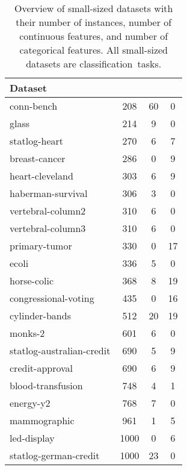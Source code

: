 \documentclass{article}
\theoremstyle{plain}
\theoremstyle{definition}
\theoremstyle{remark}
\begin{document}
\begin{table}[ht]
    \caption{Overview of small-sized datasets with their number of instances, number
    of continuous features, and number of categorical features. All small-sized datasets are classification~tasks.\label{tab:small-sized datasets}}
    \begin{center}
        \begin{tabular}{lS[table-format=4.0]S[table-format=2.0]S[table-format=2.0]}
               {\bf Dataset} & {} & {} & {}\\
               \toprule
             conn-bench & 208 & 60 & 0 \\
             glass & 214 & 9 & 0 \\
             statlog-heart & 270 & 6 & 7 \\
             breast-cancer & 286 & 0 & 9 \\
             heart-cleveland & 303 & 6 & 9 \\
             haberman-survival & 306 & 3 & 0 \\
             vertebral-column2 & 310 & 6 & 0 \\
             vertebral-column3 & 310 & 6 & 0 \\
             primary-tumor & 330 & 0 & 17 \\
             ecoli & 336 & 5 & 0 \\
             horse-colic & 368 & 8 & 19 \\
             congressional-voting & 435 & 0 & 16 \\
             cylinder-bands & 512 & 20 & 19 \\
             monks-2 & 601 & 6 & 0 \\
             statlog-australian-credit & 690 & 5 & 9 \\
             credit-approval & 690 & 6 & 9 \\
             blood-transfusion & 748 & 4 & 1 \\
             energy-y2 & 768 & 7 & 0 \\
             mammographic & 961 & 1 & 5 \\
             led-display & 1000 & 0 & 6 \\
             statlog-german-credit & 1000 & 23 & 0
        \end{tabular}
    \end{center}
\end{table}
\end{document}

